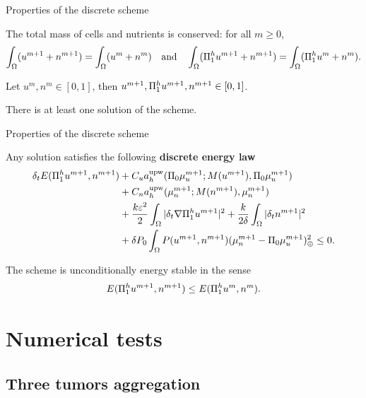\begin{frame}{Properties of the discrete scheme}
	\begin{proposition}
		The total mass of cells and nutrients is conserved: for all $m\ge 0$,
		\footnotesize
		\begin{align*}
		\int_\Omega (u^{m+1}+n^{m+1})=\int_\Omega (u^m+n^m)\quad\text{and}\quad\int_\Omega (\Pi_1^h u^{m+1}+n^{m+1})=\int_\Omega (\Pi_1^h u^m+n^m).
		\end{align*}
	\end{proposition}
	\begin{theorem}
		Let $u^{m},n^{m}\in[0,1]$, then $u^{m+1},\Pi_1^h u^{m+1},n^{m+1}\in[0,1]$.
	\end{theorem}
	\begin{theorem}
		There is at least one solution of the scheme.
	\end{theorem}
\end{frame}
\begin{frame}{Properties of the discrete scheme}
	\begin{theorem}
		Any solution satisfies the following \textbf{discrete energy law}
		{\footnotesize
		\begin{align*}
			\delta_t E(\Pi_1^h u^{m+1},n^{m+1})&+C_ua_h^{\text{upw}}(\Pi_0\mu_u^{m+1};M(u^{m+1}),\Pi_0\mu_u^{m+1})\\&+C_na_h^{\text{upw}}(\mu_n^{m+1};M(n^{m+1}),\mu_n^{m+1})\notag\\&+\frac{k\varepsilon^2}{2}\int_\Omega|\delta_t\nabla \Pi_1^h u^{m+1}|^2+\frac{k}{2\delta}\int_\Omega \vert\delta_t n^{m+1}\vert^2\nonumber\\&+\delta P_0\int_\Omega P(u^{m+1},n^{m+1}) (\mu_n^{m+1}-\Pi_0\mu_u^{m+1})_\oplus ^2
			\le 0.
		\end{align*}
		}
	\end{theorem}
	\begin{corollary}
		The scheme is unconditionally energy stable in the sense
		$$
		E(\Pi_1^h u^{m+1},n^{m+1})\le E(\Pi_1^h u^{m},n^{m}).
		$$
	\end{corollary}
\end{frame}

\section{Numerical tests}

\subsection{Three tumors aggregation}

